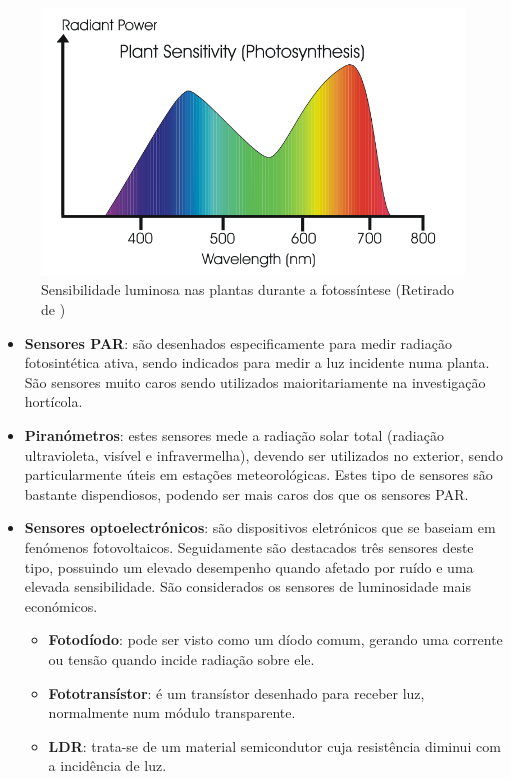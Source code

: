 \begin{figure}[!htb]
	\centering
	\includegraphics[scale=0.3]{img/plantagrap.png}
	\caption[Sensibilidade luminosa nas plantas durante a fotossíntese)]{Sensibilidade luminosa nas plantas durante a fotossíntese (Retirado de \cite{Argus2010})}
	\label{grapFoto}
\end{figure}




\begin{itemize}
	\item \textbf{Sensores \ac{PAR}}: são desenhados especificamente para medir radiação fotosintética ativa, sendo indicados para medir a luz incidente numa planta. São sensores muito caros sendo utilizados maioritariamente na investigação hortícola. 
	


	
	
	
	\item \textbf{Piranómetros}: estes sensores mede a radiação solar total (radiação ultravioleta, visível e infravermelha), devendo ser utilizados no exterior, sendo particularmente úteis em estações meteorológicas. Estes tipo de sensores são bastante dispendiosos, podendo ser mais caros dos que os sensores \ac{PAR}. 
	
	
	
	
	\item \textbf{Sensores optoelectrónicos}: são dispositivos eletrónicos que se baseiam em fenómenos fotovoltaicos. Seguidamente são destacados três sensores deste tipo, possuindo um elevado desempenho quando afetado por ruído e uma elevada sensibilidade. São considerados os sensores de luminosidade mais económicos.  
	 
		\begin{itemize}
			\item \textbf{Fotodíodo}: pode ser visto como um díodo comum, gerando uma corrente ou tensão quando incide radiação sobre ele.
			\item \textbf{Fototransístor}: é um transístor desenhado para receber luz, normalmente num módulo transparente.
			\item \textbf{\ac{LDR}}: trata-se de um material semicondutor cuja resistência diminui com a incidência de luz. 
		\end{itemize}
	
\end{itemize}





